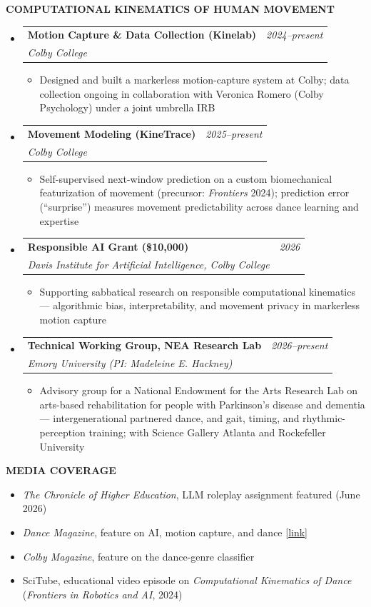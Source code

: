 \documentclass[letterpaper,11pt]{article}
\makeatletter
\newcommand{\resumeProject}[4]{
\vspace{0mm}\item
    \begin{tabular*}{0.98\textwidth}[t]{l@{\extracolsep{\fill}}r}
        \textbf{#1} & \textit{\footnotesize{#3}} \\
        \footnotesize{\textit{#2}} & \footnotesize{#4}
    \end{tabular*}
    \vspace{-2.4mm}
}
\newcommand{\resumeSubHeadingListStart}{\begin{itemize}[leftmargin=*,labelsep=1mm,itemsep=0.4mm,topsep=0mm]}
\newcommand{\resumeItemListStart}{\begin{itemize}[leftmargin=*,labelsep=1mm,itemsep=0.3mm,topsep=0mm]}
\newcommand{\resumeSubHeadingListEnd}{\end{itemize}}
\newcommand{\resumeItemListEnd}{\end{itemize}}
\newcommand{\cvsection}[1]{%
  \needspace{6\baselineskip}%
  \vspace{1mm}
  \begin{tcolorbox}
    \textbf{\large #1}
  \end{tcolorbox}
  \vspace{1mm}
}
\makeatother
\begin{document}
\cvsection{COMPUTATIONAL KINEMATICS OF HUMAN MOVEMENT}
\resumeSubHeadingListStart

\resumeProject
    {Motion Capture \& Data Collection (Kinelab)}{Colby College}{2024--present}{}
\resumeItemListStart
    \item Designed and built a markerless motion-capture system at Colby; data collection ongoing in collaboration with Veronica Romero (Colby Psychology) under a joint umbrella IRB
\resumeItemListEnd

\resumeProject
    {Movement Modeling (KineTrace)}{Colby College}{2025--present}{}
\resumeItemListStart
    \item Self-supervised next-window prediction on a custom biomechanical featurization of movement (precursor: \textit{Frontiers} 2024); prediction error (``surprise'') measures movement predictability across dance learning and expertise
\resumeItemListEnd

\resumeProject
    {Responsible AI Grant (\$10{,}000)}{Davis Institute for Artificial Intelligence, Colby College}{2026}{}
\resumeItemListStart
    \item Supporting sabbatical research on responsible computational kinematics --- algorithmic bias, interpretability, and movement privacy in markerless motion capture
\resumeItemListEnd

\resumeProject
    {Technical Working Group, NEA Research Lab}{Emory University (PI: Madeleine E. Hackney)}{2026--present}{}
\resumeItemListStart
    \item Advisory group for a National Endowment for the Arts Research Lab on arts-based rehabilitation for people with Parkinson's disease and dementia --- intergenerational partnered dance, and gait, timing, and rhythmic-perception training; with Science Gallery Atlanta and Rockefeller University
\resumeItemListEnd

\resumeSubHeadingListEnd

\cvsection{MEDIA COVERAGE}
\resumeItemListStart
    \item \textit{The Chronicle of Higher Education}, LLM roleplay assignment featured (June 2026)
    \item \textit{Dance Magazine}, feature on AI, motion capture, and dance [\href{https://dancemagazine.com/ai-motion-capture-dance/}{link}]
    \item \textit{Colby Magazine}, feature on the dance-genre classifier
    \item SciTube, educational video episode on \textit{Computational Kinematics of Dance} (\textit{Frontiers in Robotics and AI}, 2024)
\resumeItemListEnd
\end{document}
